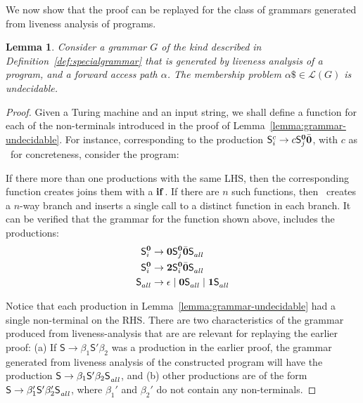 \documentclass[preprint,9pt]{sigplanconf}
\newtheorem{lemma}[theorem]{Lemma}
\begin{document}
We now show that the proof can be replayed for the class of grammars
generated from liveness analysis of programs. 

\begin{lemma}\label{lemma:grammar-from-analysis-undecidable}
Consider    a    grammar    $G$    of   the    kind    described    in
Definition~\ref{def:specialgrammar}  that  is  generated  by  liveness
analysis  of a  program,  and  a forward  access  path $\alpha$.   The
membership problem $\alpha\$ \in \mathscr{L}(G)$ is undecidable.
\end{lemma} 

\begin{proof}
Given a Turing machine and an input string, we shall define a function
for   each  of   the  non-terminals   introduced  in   the  proof   of
Lemma~\ref{lemma:grammar-undecidable}.
For instance, corresponding to the production $\mathsf{S}_{i}^{c} \rightarrow
c \mathsf{S}_{j}^{\mathbf{0}}\bar{\mathbf{0}}$, with $c$ as \acar\ for concreteness, consider
the program:
 


If there more than one productions with the same LHS, then the
corresponding function creates joins them with a $\mbox{$\mathbf{ if}$}$.   If there
are $n$ such functions,  then \mainpgm\  creates  a $n$-way
branch  and inserts  a  single call  to a  distinct  function in  each
branch. It can  be verified that the grammar for the function shown
above, includes the productions:
\begin{align*}
\mathsf{S}_{i}^{\mathbf{0}} &\rightarrow \mathbf{0}\mathsf{S}_{j}^{\mathbf{0}}\bar{\mathbf{0}}\mathsf{S}_{all}^{} \\
\mathsf{S}_{i}^{\mathbf{0}} &\rightarrow {\mathbf{2}}\mathsf{S}_{i}^{\mathbf{0}}\bar{\mathbf{0}}\mathsf{S}_{all}^{} \\
\mathsf{S}_{all}^{} &\rightarrow \epsilon \mid \mathbf{0}\mathsf{S}_{all}^{} \mid
\mathbf{1}\mathsf{S}_{all}^{}
\end{align*}



Notice that  each production  in Lemma~\ref{lemma:grammar-undecidable}
had a single non-terminal on the RHS. There are two characteristics of
the grammar produced from liveness-analysis  that are are relevant for
replaying the  earlier proof:  (a) If $\mathsf{S}  \rightarrow \beta_1
\mathsf{S'}  \beta_2$  was a  production  in  the earlier  proof,  the
grammar  generated from  liveness  analysis of the constructed program
will  have the  production
$\mathsf{S}      \rightarrow      \beta_1     \mathsf{S'}      \beta_2
\mathsf{S}_{\mathit{all}}^{}$,  and (b)  other  productions are  of the  form
$\mathsf{S}       \rightarrow       \beta_1'\mathsf{S'}       \beta_2'
\mathsf{S}_{\mathit{all}}^{}$, where $\beta_1'$ and $\beta_2'$ do not contain
any non-terminals.


\end{proof}
\end{document}

